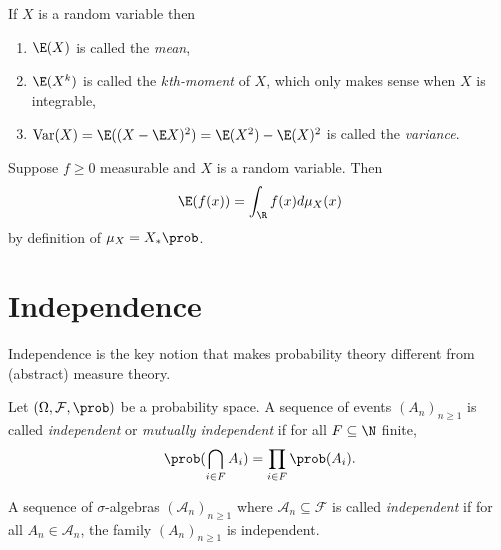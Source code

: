 \documentclass[a4paper]{article}
\renewcommand{\P}{\prob} %
\DeclareMathOperator{\var}{Var} %
\begin{document}
\begin{definition}
  If \(X\) is a random variable then
  \begin{enumerate}
  \item \(\E(X)\) is called the \emph{mean},
  \item \(\E(X^k)\) is called the \emph{\(k\)th-moment} of \(X\), which only makes sense when \(X\) is integrable,
  \item \(\var(X) = \E((X - \E X)^2) = \E(X^2) - \E(X)^2\) is called the \emph{variance}.
  \end{enumerate}
\end{definition}

\begin{remark}
  Suppose \(f \geq 0\) measurable and \(X\) is a random variable. Then
  \[
    \E(f(x)) = \int_\R f(x) d \mu_X(x)
  \]
  by definition of \(\mu_X = X_* \P\).
\end{remark}

\section{Independence}

Independence is the key notion that makes probability theory different from (abstract) measure theory.

\begin{definition}[independence]
  Let \((\Omega, \mathcal F, \P)\) be a probability space. A sequence of events \((A_n)_{n \geq 1}\) is called \emph{independent} or \emph{mutually independent} if for all \(F \subseteq \N\) finite,
  \[
    \P(\bigcap_{i \in F} A_i) = \prod_{i \in F} \P(A_i).
  \]
\end{definition}

\begin{definition}
  A sequence of \(\sigma\)-algebras \((\mathcal A_n)_{n \geq 1}\) where \(\mathcal A_n \subseteq \mathcal F\) is called \emph{independent} if for all \(A_n \in \mathcal A_n\), the family \((A_n)_{n \geq 1}\) is independent.
\end{definition}
\end{document}
